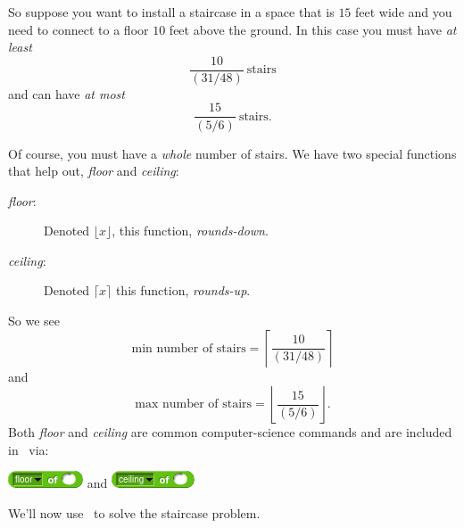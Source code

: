 \documentclass[noauthor,nooutcomes,12pt,handout]{ximera}
\begin{document}
So suppose you want to install a staircase in a space that is $15$
feet wide and you need to connect to a floor $10$ feet above the
ground. In this case you must have \emph{at least}
\[
\frac{10}{\left(31/48\right)} \ \text{stairs}
\]
and can have \emph{at most}
\[
\frac{15}{\left(5/6\right)} \ \text{stairs}.
\]


Of course, you must have a \emph{whole} number of stairs. We have two special functions that help out, \emph{floor} and \emph{ceiling}:
\begin{description}
\item[\emph{floor}:] Denoted $\lfloor x\rfloor$, this function, \emph{rounds-down}.
\item[\emph{ceiling}:] Denoted $\lceil x\rceil$ this function, \emph{rounds-up}.
\end{description}
So we see
\[
\text{min number of stairs} = \left\lceil \frac{10}{\left(31/48\right)} \right\rceil
\]
and
\[
\text{max number of stairs} = \left\lfloor \frac{15}{\left(5/6\right)} \right\rfloor.
\]
Both \emph{floor} and \emph{ceiling} are common computer-science
commands and are included in \snap\ via:
\begin{center}
  \includegraphics{floor-script.png}
  \qquad
  and
  \qquad
\includegraphics{ceiling-script.png}
\end{center}
We'll now use \snap\ to solve the staircase problem.

\mynewpage
\end{document}
